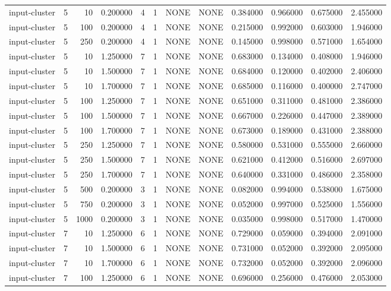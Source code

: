 \begin{tabular}{lrrrllllrrrr}
input-cluster & 5 & 10 & 0.200000 & 4 & 1 & NONE & NONE & 0.384000 & 0.966000 & 0.675000 & 2.455000 \\
input-cluster & 5 & 100 & 0.200000 & 4 & 1 & NONE & NONE & 0.215000 & 0.992000 & 0.603000 & 1.946000 \\
input-cluster & 5 & 250 & 0.200000 & 4 & 1 & NONE & NONE & 0.145000 & 0.998000 & 0.571000 & 1.654000 \\
input-cluster & 5 & 10 & 1.250000 & 7 & 1 & NONE & NONE & 0.683000 & 0.134000 & 0.408000 & 1.946000 \\
input-cluster & 5 & 10 & 1.500000 & 7 & 1 & NONE & NONE & 0.684000 & 0.120000 & 0.402000 & 2.406000 \\
input-cluster & 5 & 10 & 1.700000 & 7 & 1 & NONE & NONE & 0.685000 & 0.116000 & 0.400000 & 2.747000 \\
input-cluster & 5 & 100 & 1.250000 & 7 & 1 & NONE & NONE & 0.651000 & 0.311000 & 0.481000 & 2.386000 \\
input-cluster & 5 & 100 & 1.500000 & 7 & 1 & NONE & NONE & 0.667000 & 0.226000 & 0.447000 & 2.389000 \\
input-cluster & 5 & 100 & 1.700000 & 7 & 1 & NONE & NONE & 0.673000 & 0.189000 & 0.431000 & 2.388000 \\
input-cluster & 5 & 250 & 1.250000 & 7 & 1 & NONE & NONE & 0.580000 & 0.531000 & 0.555000 & 2.660000 \\
input-cluster & 5 & 250 & 1.500000 & 7 & 1 & NONE & NONE & 0.621000 & 0.412000 & 0.516000 & 2.697000 \\
input-cluster & 5 & 250 & 1.700000 & 7 & 1 & NONE & NONE & 0.640000 & 0.331000 & 0.486000 & 2.358000 \\
input-cluster & 5 & 500 & 0.200000 & 3 & 1 & NONE & NONE & 0.082000 & 0.994000 & 0.538000 & 1.675000 \\
input-cluster & 5 & 750 & 0.200000 & 3 & 1 & NONE & NONE & 0.052000 & 0.997000 & 0.525000 & 1.556000 \\
input-cluster & 5 & 1000 & 0.200000 & 3 & 1 & NONE & NONE & 0.035000 & 0.998000 & 0.517000 & 1.470000 \\
input-cluster & 7 & 10 & 1.250000 & 6 & 1 & NONE & NONE & 0.729000 & 0.059000 & 0.394000 & 2.091000 \\
input-cluster & 7 & 10 & 1.500000 & 6 & 1 & NONE & NONE & 0.731000 & 0.052000 & 0.392000 & 2.095000 \\
input-cluster & 7 & 10 & 1.700000 & 6 & 1 & NONE & NONE & 0.732000 & 0.052000 & 0.392000 & 2.096000 \\
input-cluster & 7 & 100 & 1.250000 & 6 & 1 & NONE & NONE & 0.696000 & 0.256000 & 0.476000 & 2.053000 \\

\end{tabular}
